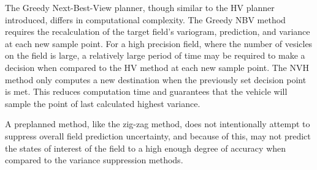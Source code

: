 The Greedy Next-Best-View planner, though similar to the HV planner introduced, differs in computational complexity. The Greedy NBV method requires the recalculation of the target field's variogram, prediction, and variance at each new sample point. For a high precision field, where the number of vesicles on the field is large, a relatively large period of time may be required to make a decision when compared to the HV method at each new sample point. The NVH method only computes a new destination when the previously set decision point is met. This reduces computation time and guarantees that the vehicle will sample the point of last calculated highest variance.

A preplanned method, like the zig-zag method, does not intentionally attempt to suppress overall field prediction uncertainty, and because of this, may not predict the states of interest of the field to a high enough degree of accuracy when compared to the variance suppression methods.